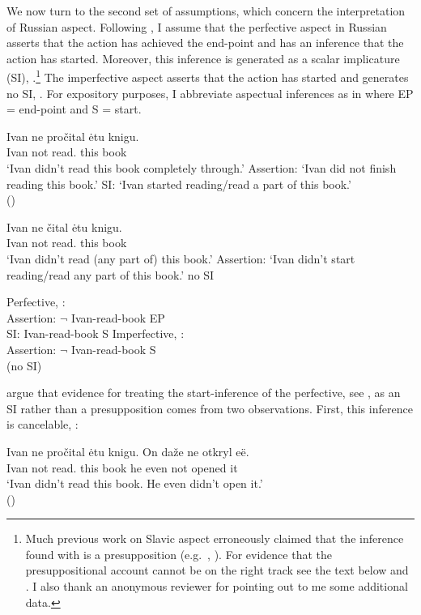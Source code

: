\documentclass[output=paper,
modfonts,
newtxmath,colorlinks,citecolor=brown
]{langscibook}
\begin{document}
\noindent We now turn to the second set of assumptions, which concern the interpretation of Russian aspect. Following \citet{zinfil14}, I assume that the perfective aspect in Russian asserts that the action has achieved the end-point and has an inference that the action has started. Moreover, this inference is generated as a scalar implicature (SI), .\footnote{Much previous work on Slavic aspect erroneously claimed that the inference found with \p is a presupposition (e.g.\ \citealt{bog85}, \citealt{rap85}). For evidence that the presuppositional account cannot be on the right track see the text below and \citet{zinfil14}. I also thank an anonymous reviewer for pointing out to me some additional data. 
}
 The imperfective aspect asserts that the action has started and generates no SI, . For expository purposes, I abbreviate aspectual inferences as in  where EP = end-point and S = start.

\ea \label{pfv} \ea \gll Ivan ne pročital ėtu knigu. \\
    	Ivan not {read.\p} this book \\
        \glt `Ivan  didn't read this book completely through.'
        \ex  Assertion: `Ivan did not finish reading this book.'
   		\ex  SI: `Ivan started reading/read a part of this book.' \label{pfvsi} \\
        \hfill  (\citealt[383]{zinfil14})
	\z \z  
 		
 \ea \label{ipfv} \ea \gll Ivan ne čital ėtu knigu. \\
    	Ivan not {read.\im} this book \\
        \glt `Ivan  didn't read (any part of) this book.'
 		\ex  Assertion: `Ivan didn't start reading/read any part of this book.'
        \ex no SI
        \z \z 

	\ea \label{abbrasp} \ea Perfective, : \\
    	Assertion: $\neg$ Ivan-read-book EP \\
        SI: Ivan-read-book S
   \ex Imperfective, : \\
        Assertion: $\neg$ Ivan-read-book S \\
        (no SI) 
	\z \z 
    

\noindent \cite{zinfil14} argue that evidence for treating the start-inference of the perfective, see , as an SI rather than a presupposition comes from two observations. First, this inference is cancelable, :

\ea \label{cancel} \gll Ivan ne pročital ėtu knigu. On da\v ze ne otkryl e\"e.  \\
    	Ivan not {read.\p} this book he even not opened it\\
       \glt  `Ivan  didn't read this book. He even didn't open it.' \\
        \hfill (\citealt[391]{zinfil14})  
	\z 
\end{document}
